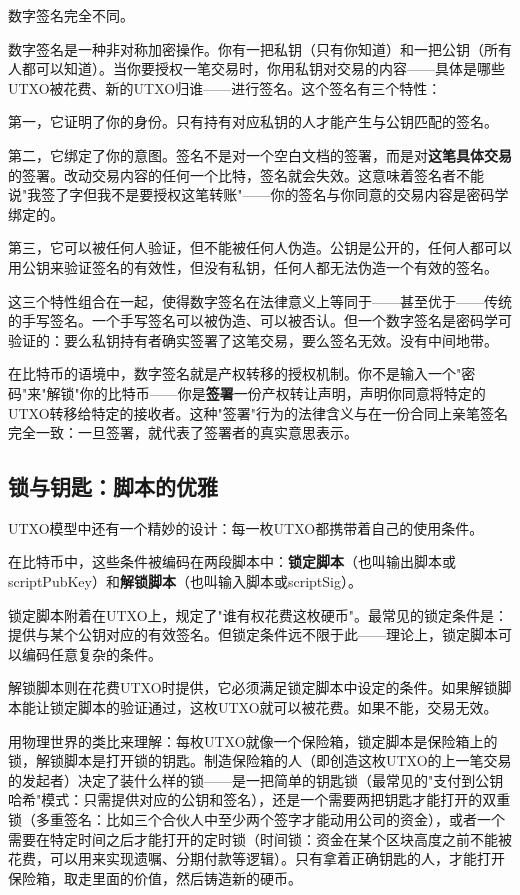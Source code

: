 \documentclass[a4paper,12pt,openany]{ctexbook}
\begin{document}
数字签名完全不同。

数字签名是一种非对称加密操作。你有一把私钥（只有你知道）和一把公钥（所有人都可以知道）。当你要授权一笔交易时，你用私钥对交易的内容——具体是哪些UTXO被花费、新的UTXO归谁——进行签名。这个签名有三个特性：

第一，它证明了你的身份。只有持有对应私钥的人才能产生与公钥匹配的签名。

第二，它绑定了你的意图。签名不是对一个空白文档的签署，而是对\textbf{这笔具体交易}的签署。改动交易内容的任何一个比特，签名就会失效。这意味着签名者不能说"我签了字但我不是要授权这笔转账"——你的签名与你同意的交易内容是密码学绑定的。

第三，它可以被任何人验证，但不能被任何人伪造。公钥是公开的，任何人都可以用公钥来验证签名的有效性，但没有私钥，任何人都无法伪造一个有效的签名。

这三个特性组合在一起，使得数字签名在法律意义上等同于——甚至优于——传统的手写签名。一个手写签名可以被伪造、可以被否认。但一个数字签名是密码学可验证的：要么私钥持有者确实签署了这笔交易，要么签名无效。没有中间地带。

在比特币的语境中，数字签名就是产权转移的授权机制。你不是输入一个"密码"来"解锁"你的比特币——你是\textbf{签署}一份产权转让声明，声明你同意将特定的UTXO转移给特定的接收者。这种"签署"行为的法律含义与在一份合同上亲笔签名完全一致：一旦签署，就代表了签署者的真实意思表示。


\subsection*{锁与钥匙：脚本的优雅}


UTXO模型中还有一个精妙的设计：每一枚UTXO都携带着自己的使用条件。

在比特币中，这些条件被编码在两段脚本中：\textbf{锁定脚本}（也叫输出脚本或scriptPubKey）和\textbf{解锁脚本}（也叫输入脚本或scriptSig）。

锁定脚本附着在UTXO上，规定了"谁有权花费这枚硬币"。最常见的锁定条件是：提供与某个公钥对应的有效签名。但锁定条件远不限于此——理论上，锁定脚本可以编码任意复杂的条件。

解锁脚本则在花费UTXO时提供，它必须满足锁定脚本中设定的条件。如果解锁脚本能让锁定脚本的验证通过，这枚UTXO就可以被花费。如果不能，交易无效。

用物理世界的类比来理解：每枚UTXO就像一个保险箱，锁定脚本是保险箱上的锁，解锁脚本是打开锁的钥匙。制造保险箱的人（即创造这枚UTXO的上一笔交易的发起者）决定了装什么样的锁——是一把简单的钥匙锁（最常见的"支付到公钥哈希"模式：只需提供对应的公钥和签名），还是一个需要两把钥匙才能打开的双重锁（多重签名：比如三个合伙人中至少两个签字才能动用公司的资金），或者一个需要在特定时间之后才能打开的定时锁（时间锁：资金在某个区块高度之前不能被花费，可以用来实现遗嘱、分期付款等逻辑）。只有拿着正确钥匙的人，才能打开保险箱，取走里面的价值，然后铸造新的硬币。
\end{document}
